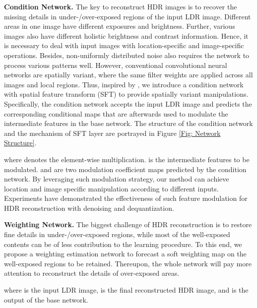\documentclass[final]{cvpr}
\begin{document}
\textbf{Condition Network.} The key to reconstruct HDR images is to recover the missing details in under-/over-exposed regions of the input LDR image. Different areas in one image have different exposures and brightness. Further, various images also have different holistic brightness and contrast information. Hence, it is necessary to deal with input images with location-specific and image-specific operations. Besides, non-uniformly distributed noise also requires the network to process various patterns well. However, conventional convolutional neural networks are spatially variant, where the same filter weights are applied across all images and local regions. Thus, inspired by \cite{wang2018recovering, liu2021very}, we introduce a condition network with spatial feature transform (SFT) \cite{wang2018recovering} to provide spatially variant manipulations. Specifically, the condition network accepts the input LDR image and predicts the corresponding conditional maps that are afterwards used to modulate the intermediate features in the base network. The structure of the condition network and the mechanism of SFT layer are portrayed in Figure \ref{Fig: Network Structure}.

where  denotes the element-wise multiplication.  is the intermediate features to be modulated.  and  are two modulation coefficient maps predicted by the condition network. By leveraging such modulation strategy, our method can achieve location and image specific manipulation according to different inputs. Experiments have demonstrated the effectiveness of such feature modulation for HDR reconstruction with denoising and dequantization.

\textbf{Weighting Network.} The biggest challenge of HDR reconstruction is to restore fine details in under-/over-exposed regions, while most of the well-exposed contents can be of less contribution to the learning procedure. To this end, we propose a weighting estimation network to forecast a soft weighting map  on the well-exposed regions to be retained. Thereupon, the whole network will pay more attention to reconstruct the details of over-exposed areas.

where  is the input LDR image,  is the final reconstructed HDR image, and  is the output of the base network.
\end{document}
